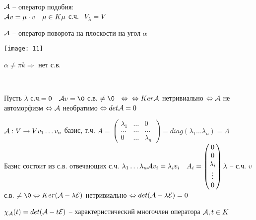 \documentclass[../main.tex]{subfiles}
\begin{document}
	\begin{examples}
		\ \\
		\begin{mylist}
			\item 
			$\mathcal{A}$ -- оператор подобия:\\
			$\mathcal{A} v = \mu \cdot v \ \ \ \mu \in K\\
			\mu$ с.ч. $\ \ V_\lambda = V$
			\item 
			$\mathcal{A}$ -- оператор поворота на плоскости на угол $\alpha$\\
			\begin{minipage}{0.2\textwidth}
				\texttt{[image: 11]}
			\end{minipage}
			\begin{minipage}{0.8\textwidth}
				$\alpha \neq \pi k \Rightarrow$ нет с.в.
			\end{minipage} \\
			\item 
			Пусть $\lambda$ с.ч.$=0 \ \ \ \A v = \0 \ $с.в. $\neq \0 \ \ \Leftrightarrow\\
			\Leftrightarrow Ker\A$ нетривиально $\Leftrightarrow \mathcal{A}$ не автоморфизм $\Leftrightarrow \mathcal{A}$ необратимо $\Leftrightarrow det\mathcal{A} = 0$ 
			\item $\mathcal{A}: V\rightarrow V\\
			v_1\ldots v_n$ базис, т.ч. $A = \begin{pmatrix}
			\lambda_1 & \ldots & 0\\
			\ldots & \ldots & \ldots\\
			0 & \ldots & \lambda_n
			\end{pmatrix} = diag(\lambda_1\ldots\lambda_n) = \Lambda$\\
			Базис состоит из с.в. отвечающих с.ч. $\lambda_1 \ldots \lambda_n\\
			\mathcal{A} v_i = \lambda_i v_i \ \ \ A_i = \begin{pmatrix}
			0\\0\\\lambda_i\\\vdots\\0
			\end{pmatrix}\\
			\lambda$ -- с.ч. $v$ с.в. $\neq \0 \Leftrightarrow Ker(\A-\lambda\E)$ нетривиально $\Leftrightarrow det(\mathcal{A} - \lambda\mathcal{E}) = 0$
		\end{mylist}
	\end{examples}
	\begin{defin}
		$\chi_{\mathcal{A}} (t) = det(\mathcal{A}-t\mathcal{E})$ -- характеристический многочлен оператора $\mathcal{A}, t\in K$
	\end{defin}
	
\end{document}

